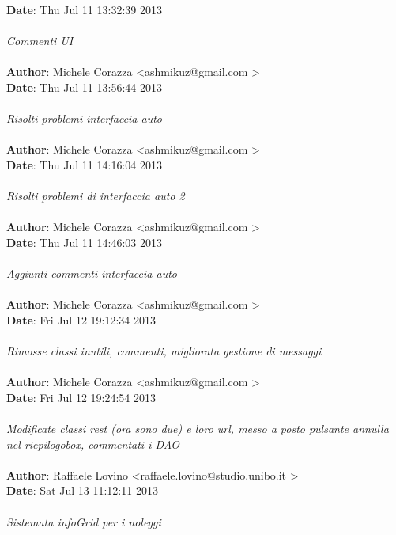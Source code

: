 \documentclass[a4paper,12pt]{article} %
\begin{document}
\textbf{Date}:   Thu Jul 11 13:32:39 2013 \\
\\
    \emph{Commenti UI}\\
\\
\textbf{Author}: Michele Corazza \textless ashmikuz@gmail.com \textgreater \\
\textbf{Date}:   Thu Jul 11 13:56:44 2013 \\
\\
    \emph{Risolti problemi interfaccia auto}\\
\\
\textbf{Author}: Michele Corazza \textless ashmikuz@gmail.com \textgreater \\
\textbf{Date}:   Thu Jul 11 14:16:04 2013 \\
\\
    \emph{Risolti problemi di interfaccia auto 2}\\
\\
\textbf{Author}: Michele Corazza \textless ashmikuz@gmail.com \textgreater \\
\textbf{Date}:   Thu Jul 11 14:46:03 2013 \\
\\
    \emph{Aggiunti commenti interfaccia auto}\\
\\
\textbf{Author}: Michele Corazza \textless ashmikuz@gmail.com \textgreater \\
\textbf{Date}:   Fri Jul 12 19:12:34 2013 \\
\\
    \emph{Rimosse classi inutili, commenti, migliorata gestione di messaggi}\\
\\
\textbf{Author}: Michele Corazza \textless ashmikuz@gmail.com \textgreater \\
\textbf{Date}:   Fri Jul 12 19:24:54 2013 \\
\\
    \emph{Modificate classi rest (ora sono due) e loro url, messo a posto pulsante annulla nel riepilogobox, commentati i DAO}\\
\\
\textbf{Author}: Raffaele Lovino \textless raffaele.lovino@studio.unibo.it \textgreater \\
\textbf{Date}:   Sat Jul 13 11:12:11 2013 \\
\\
    \emph{Sistemata infoGrid per i noleggi}\\
\\
\end{document}
